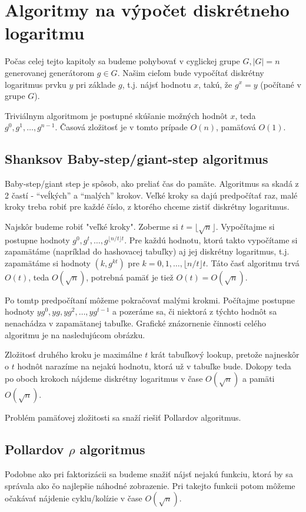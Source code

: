 \section{Algoritmy na výpočet diskrétneho logaritmu}
Počas celej tejto kapitoly sa budeme pohybovať v cyglickej grupe 
$G, |G|=n$ generovanej generátorom $g \in G$.
Našim cieľom bude vypočítať diskrétny logaritmus prvku $y$
pri základe $g$, t.j. nájsť hodnotu $x$, takú, že $g^x=y$ (počítané
v grupe $G$).


Triviálnym algoritmom je postupné skúšanie možných hodnôt $x$, teda
$g^0,g^1,\dots,g^{n-1}$.
Časová zložitosť je v tomto prípade $O(n)$, pamäťová $O(1)$.

\subsection{Shanksov Baby-step/giant-step algoritmus}
Baby-step/giant step je spôsob, ako preliať čas do pamäte.
Algoritmus sa skadá z 2 častí - ``veĺkých'' a ``malých'' krokov.
Veľké kroky sa dajú predpočítať raz, malé kroky treba robiť pre každé
číslo, z ktorého chceme zistiť diskrétny logaritmus.

Najskôr budeme robiť "veľké kroky".
Zoberme si $t=\lfloor \sqrt{n} \rfloor$.
Vypočítajme si postupne hodnoty $g^0,g^t,\dots,g^{\lfloor n/t \rfloor t}$.
Pre každú hodnotu, ktorú takto vypočítame si zapamätáme (napríklad do
hashovacej tabuľky) aj jej diskrétny logaritmus, t.j. zapamätáme si hodnoty
$(k,g^{kt})$ pre $k=0,1,\dots,\lfloor n/t \rfloor t$.
Táto časť algoritmu trvá $O(t)$, teda $O(\sqrt{n})$, potrebná pamäť je
tiež $O(t)=O(\sqrt{n})$.

Po tomtp predpočítaní môžeme pokračovať malými krokmi.
Počítajme postupne hodnoty $y g^0,yg,yg^2,\dots, yg^{t-1}$ a pozeráme sa,
či niektorá z týchto hodnôt sa nenachádza v zapamätanej tabuľke.
Grafické znázornenie činnosti celého algoritmu je na nasledujúcom obrázku.

Zložitosť druhého kroku je maximálne $t$ krát tabuľkový lookup, pretože
najneskôr o $t$ hodnôt narazíme na nejakú hodnotu, ktorá už v tabuľke bude.
Dokopy teda po oboch krokoch nájdeme diskrétny logaritmus
v čase $O(\sqrt{n})$ a pamäti $O(\sqrt{n})$.

Problém pamäťovej zložitosti sa snaží riešiť Pollardov algoritmus.

\subsection{Pollardov $\rho$ algoritmus}
Podobne ako pri faktorizácii sa budeme snažiť nájsť nejakú funkciu, ktorá
by sa správala ako čo najlepšie náhodné zobrazenie. Pri takejto funkcii
potom môžeme očakávať nájdenie cyklu/kolízie v čase $O(\sqrt{n})$.

